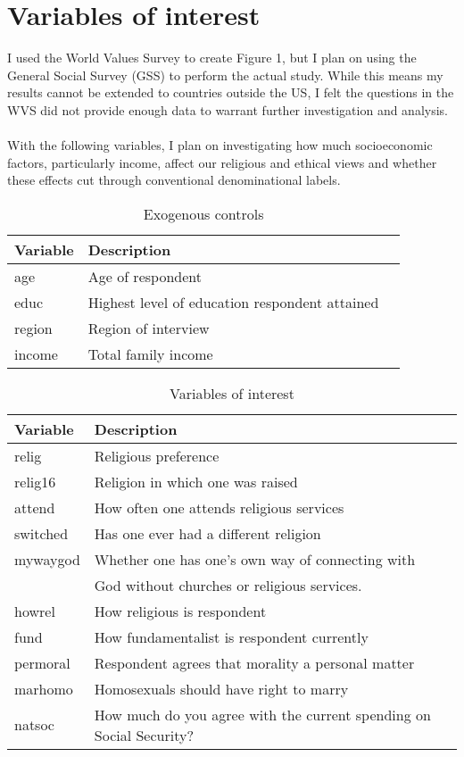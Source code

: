 \documentclass{article}
\begin{document}
	\section{Variables of interest}
	I used the World Values Survey to create Figure 1, but I plan on using the General Social Survey (GSS) to perform the actual study. While this means my results cannot be extended to countries outside the US, I felt the questions in the WVS did not provide enough data to warrant further investigation and analysis.
	\\
	\\
	With the following variables, I plan on investigating how much socioeconomic factors, particularly income, affect our religious and ethical views and whether these effects cut through conventional denominational labels.
	
	\begin{table}[h]
	\caption{Exogenous controls}
	\label{gss-controls}
	\centering
	\begin{tabular}{lll}
		\toprule
		Variable     & Description  \\
		\midrule
		age & Age of respondent \\
		educ & Highest level of education respondent attained \\
		region & Region of interview \\
		income & Total family income \\
		\bottomrule
		\end{tabular}
	\end{table}
	
	\begin{table}[h]
		\caption{Variables of interest}
		\label{gss-vars}
		\centering
		\begin{tabular}{lll}
			\toprule
			Variable     & Description  \\
			\midrule
			relig & Religious preference \\
			relig16 & Religion in which one was raised \\ 
			attend & How often one attends religious services \\
			switched & Has one ever had a different religion \\
			mywaygod & Whether one has one's own way of connecting with \\
				     & God without churches or religious services. \\
			howrel & How religious is respondent \\
			fund & How fundamentalist is respondent currently \\
			permoral & Respondent agrees that morality a personal matter \\
			marhomo & Homosexuals should have right to marry \\
			natsoc & How much do you agree with the current spending on Social Security? \\
			\bottomrule
		\end{tabular}
	\end{table}
	
	\newpage
	\nocite{*}
	
\end{document}
